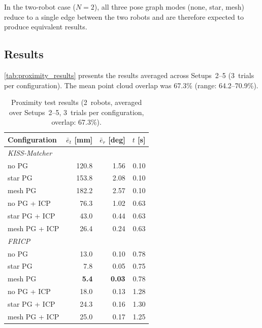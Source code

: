 In the two-robot case ($N = 2$), all three pose graph modes
(none, star, mesh) reduce to a single edge between the two robots
and are therefore expected to produce equivalent results.

\subsection{Results}

\autoref{tab:proximity_results} presents the results averaged
across Setups~2--5 (3~trials per configuration).
The mean point cloud overlap was 67.3\% (range: 64.2--70.9\%).

\begin{table}[htbp]
    \centering
    \caption{Proximity test results (2~robots, averaged over
             Setups~2--5, 3~trials per configuration,
             overlap: 67.3\%).}
    \label{tab:proximity_results}
    \small
    \begin{tabular}{l r r r}
        \toprule
        \textbf{Configuration}
            & $\bar{e}_t$ [mm]
            & $\bar{e}_r$ [deg]
            & $t$ [s] \\
        \midrule
        \multicolumn{4}{l}{\textit{KISS-Matcher}} \\
        \quad no PG             & 120.8  & 1.56  & 0.10 \\
        \quad star PG           & 153.8  & 2.08  & 0.10 \\
        \quad mesh PG           & 182.2  & 2.57  & 0.10 \\
        \quad no PG + ICP       &  76.3  & 1.02  & 0.63 \\
        \quad star PG + ICP     &  43.0  & 0.44  & 0.63 \\
        \quad mesh PG + ICP     &  26.4  & 0.24  & 0.63 \\
        \midrule
        \multicolumn{4}{l}{\textit{FRICP}} \\
        \quad no PG             &  13.0  & 0.10  & 0.78 \\
        \quad star PG           &   7.8  & 0.05  & 0.75 \\
        \quad mesh PG           & \textbf{5.4}  & \textbf{0.03}  & 0.78 \\
        \quad no PG + ICP       &  18.0  & 0.13  & 1.28 \\
        \quad star PG + ICP     &  24.3  & 0.16  & 1.30 \\
        \quad mesh PG + ICP     &  25.0  & 0.17  & 1.25 \\
        \bottomrule
    \end{tabular}
\end{table}

